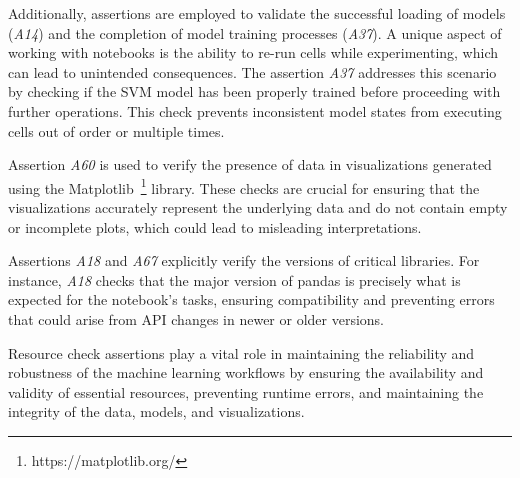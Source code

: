 Additionally, assertions are employed to validate the successful loading of models (\emph{A14}) and the completion of model training processes (\emph{A37}). A unique aspect of working with notebooks is the ability to re-run cells while experimenting, which can lead to unintended consequences. The assertion \emph{A37} addresses this scenario by checking if the SVM model has been properly trained before proceeding with further operations. This check prevents inconsistent model states from executing cells out of order or multiple times.

Assertion \emph{A60} is used to verify the presence of data in visualizations generated using the Matplotlib~\footnote{https://matplotlib.org/} library. These checks are crucial for ensuring that the visualizations accurately represent the underlying data and do not contain empty or incomplete plots, which could lead to misleading interpretations.

Assertions \emph{A18} and \emph{A67} explicitly verify the versions of critical libraries. For instance, \emph{A18} checks that the major version of pandas is precisely what is expected for the notebook’s tasks, ensuring compatibility and preventing errors that could arise from API changes in newer or older versions.

Resource check assertions play a vital role in maintaining the reliability and robustness of the machine learning workflows by ensuring the availability and validity of essential resources, preventing runtime errors, and maintaining the integrity of the data, models, and visualizations.




